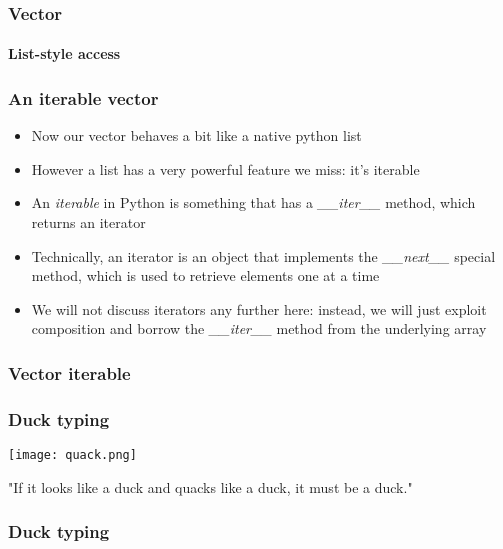 \documentclass[9pt]{beamer}
\begin{document}
\begin{frame}
  \frametitle{Vector}
  \framesubtitle{List-style access}
  
\end{frame}


\begin{frame}
  \frametitle{An iterable vector}
  
  \begin{itemize}
    \item Now our vector behaves a bit like a native python list
    \medskip
    \item However a list has a very powerful feature we miss: it's \alert{iterable}
    \medskip
    \item An \emph{iterable} in Python is something that has a
          \emph{\_\_iter\_\_} method, which returns an \alert{iterator}
    \medskip
    \item Technically, an iterator is an object that implements the
          \emph{\_\_next\_\_} special method, which is used to retrieve elements
          one at a time
    \medskip
    \item We will not discuss iterators any further here: instead, we will just
          exploit composition and borrow the \emph{\_\_iter\_\_} method from the 
          underlying array
  \end{itemize}
  
\end{frame}

\begin{frame}
  \frametitle{Vector iterable}
  
\end{frame}


\begin{frame}
  \frametitle{Duck typing}
  
  \centering
  \texttt{[image: quack.png]}  
  
  \bigskip
  
  \centering
  "If it looks like a duck and quacks like a duck, it must be a duck."
  
\end{frame}


\begin{frame}
  \frametitle{Duck typing}
  
\end{frame}
\end{document}
